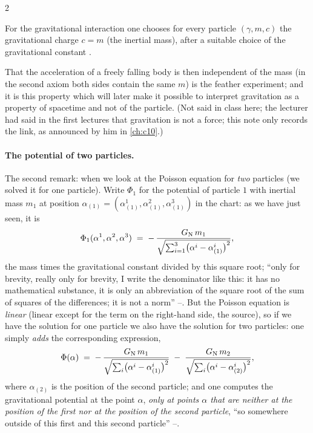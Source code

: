 \begin{paracol}{2}
\begin{definition}\label{def:ng-equivalence}
For the gravitational interaction one chooses for every particle $(\gamma,m,c)$ the gravitational charge $c=m$ (the inertial mass), after a suitable choice of the gravitational constant .
\end{definition}
\begin{aside}[Preview]
That the acceleration of a freely falling body is then independent of the mass (in the second axiom both sides contain the same $m$) is the feather experiment; and it is this property which will later make it possible to interpret gravitation as a property of spacetime and not of the particle. (Not said in class here; the lecturer had said in the first lectures that gravitation is not a force; this note only records the link, as announced by him in \cref{ch:c10}.)
\end{aside}

\paragraph{The potential of two particles.} The second remark: when we look at the Poisson equation for \emph{two} particles (we solved it for one particle). Write $\Phi_1$ for the potential of particle $1$ with inertial mass $m_1$ at position $\alpha_{(1)}=(\alpha^1_{(1)},\alpha^2_{(1)},\alpha^3_{(1)})$ in the chart: as we have just seen, it is
\[
  \Phi_1(\alpha^1,\alpha^2,\alpha^3)\;=\;-\,\frac{G_{\rm N}\,m_1}{\sqrt{\sum_{i=1}^3\bigl(\alpha^i-\alpha^i_{(1)}\bigr)^2}} ,
\]
the mass times the gravitational constant divided by this square root; ``only for brevity, really only for brevity, I write the denominator like this: it has no mathematical substance, it is only an abbreviation of the square root of the sum of squares of the differences; it is not a norm'' --. But the Poisson equation is \emph{linear} (linear except for the term on the right-hand side, the source), so if we have the solution for one particle we also have the solution for two particles: one simply \emph{adds} the corresponding expression,
\begin{equation}\label{eq:ng-two}
  \Phi(\alpha)\;=\;-\,\frac{G_{\rm N}\,m_1}{\sqrt{\sum_i\bigl(\alpha^i-\alpha^i_{(1)}\bigr)^2}}\;-\;\frac{G_{\rm N}\,m_2}{\sqrt{\sum_i\bigl(\alpha^i-\alpha^i_{(2)}\bigr)^2}} ,
\end{equation}
where $\alpha_{(2)}$ is the position of the second particle; and one computes the gravitational potential at the point $\alpha$, \emph{only at points $\alpha$ that are neither at the position of the first nor at the position of the second particle}, ``so somewhere outside of this first and this second particle'' --.


\end{paracol}
